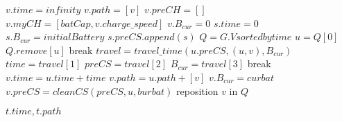 \begin{algorithmic}
    		\State $v.time = infinity$
		\State $v.path = [v]$
    		\State $v.preCH = []$
		\State $v.myCH = [batCap, v.charge\_speed]$
		\State $v.B_{cur} = 0$
    	\EndFor
	\State $s.time = 0$
	\State $s.B_{cur} = initialBattery$
	\State $s.preCS.append(s)$	
	\State $Q = G.V sorted by time$
		\State $u = Q[0]$
		\State $Q.remove[u]$
		 break \EndIf
			\State $travel = travel\_time(u.preCS, (u, v), B_{cur})$
			\State $time = travel[1]$
			\State $preCS = travel[2]$
			\State $B_{cur} = travel[3]$
			 break \EndIf
				\State $v.time = u.time + time$
				\State $v.path = u.path + [v]$
				\State $v.B_{cur} = curbat$
				\State $v.preCS = cleanCS(preCS, u, burbat)$
				\State reposition $v$ in $Q$
			\EndIf

		\EndFor
	\EndWhile
	\State \Return $t.time, t.path$
\EndFunction
\end{algorithmic}\label{alg:fastest_path}